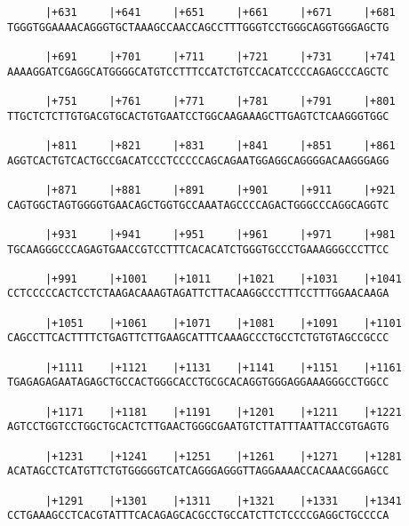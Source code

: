 \documentclass{article}
\begin{document}
\begin{Verbatim}
      |+631     |+641     |+651     |+661     |+671     |+681
TGGGTGGAAAACAGGGTGCTAAAGCCAACCAGCCTTTGGGTCCTGGGCAGGTGGGAGCTG
                                                            
      |+691     |+701     |+711     |+721     |+731     |+741
AAAAGGATCGAGGCATGGGGCATGTCCTTTCCATCTGTCCACATCCCCAGAGCCCAGCTC
                                                            
      |+751     |+761     |+771     |+781     |+791     |+801
TTGCTCTCTTGTGACGTGCACTGTGAATCCTGGCAAGAAAGCTTGAGTCTCAAGGGTGGC
                                                            
      |+811     |+821     |+831     |+841     |+851     |+861
AGGTCACTGTCACTGCCGACATCCCTCCCCCAGCAGAATGGAGGCAGGGGACAAGGGAGG
                                                            
      |+871     |+881     |+891     |+901     |+911     |+921
CAGTGGCTAGTGGGGTGAACAGCTGGTGCCAAATAGCCCCAGACTGGGCCCAGGCAGGTC
                                                            
      |+931     |+941     |+951     |+961     |+971     |+981
TGCAAGGGCCCAGAGTGAACCGTCCTTTCACACATCTGGGTGCCCTGAAAGGGCCCTTCC
                                                            
      |+991     |+1001    |+1011    |+1021    |+1031    |+1041
CCTCCCCCACTCCTCTAAGACAAAGTAGATTCTTACAAGGCCCTTTCCTTTGGAACAAGA
                                                            
      |+1051    |+1061    |+1071    |+1081    |+1091    |+1101
CAGCCTTCACTTTTCTGAGTTCTTGAAGCATTTCAAAGCCCTGCCTCTGTGTAGCCGCCC
                                                            
      |+1111    |+1121    |+1131    |+1141    |+1151    |+1161
TGAGAGAGAATAGAGCTGCCACTGGGCACCTGCGCACAGGTGGGAGGAAAGGGCCTGGCC
                                                            
      |+1171    |+1181    |+1191    |+1201    |+1211    |+1221
AGTCCTGGTCCTGGCTGCACTCTTGAACTGGGCGAATGTCTTATTTAATTACCGTGAGTG
                                                            
      |+1231    |+1241    |+1251    |+1261    |+1271    |+1281
ACATAGCCTCATGTTCTGTGGGGGTCATCAGGGAGGGTTAGGAAAACCACAAACGGAGCC
                                                            
      |+1291    |+1301    |+1311    |+1321    |+1331    |+1341
CCTGAAAGCCTCACGTATTTCACAGAGCACGCCTGCCATCTTCTCCCCGAGGCTGCCCCA
                                                            

\end{Verbatim}
\end{document}
